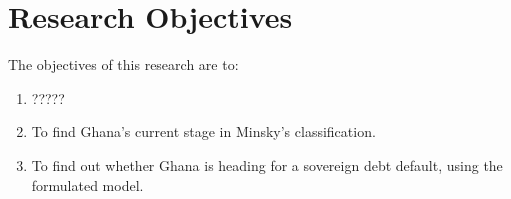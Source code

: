 \documentclass[a4paper, 12pt]{article}
\begin{document}
	
	\section{Research Objectives}
	The objectives of this research are to:
	
	\begin{enumerate}
		\item ?????
		\item To find Ghana's current stage in Minsky's classification.
		
		\item To find out whether Ghana is heading for a sovereign debt default, using the formulated model.
	\end{enumerate}
\end{document}

